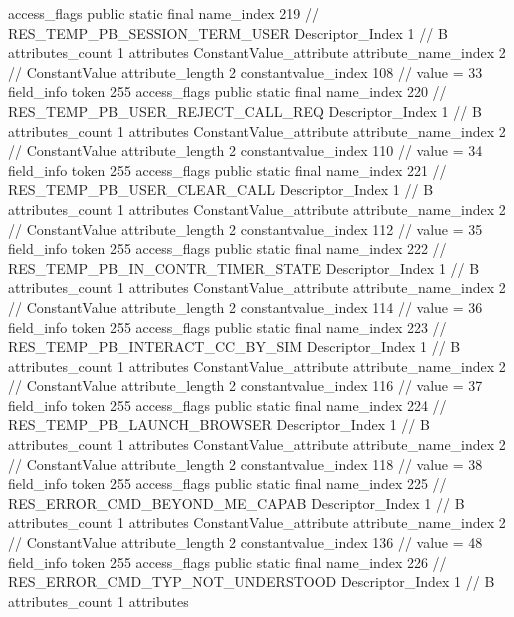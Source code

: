 {{{{{				access_flags	public static final
				name_index	219		// RES_TEMP_PB_SESSION_TERM_USER
				Descriptor_Index	1		// B
				attributes_count	1
				attributes {
				ConstantValue_attribute {
					attribute_name_index	2		// ConstantValue
					attribute_length	2
					constantvalue_index	108		// value = 33
				}
				}
			}
			field_info {
				token	255
				access_flags	public static final
				name_index	220		// RES_TEMP_PB_USER_REJECT_CALL_REQ
				Descriptor_Index	1		// B
				attributes_count	1
				attributes {
				ConstantValue_attribute {
					attribute_name_index	2		// ConstantValue
					attribute_length	2
					constantvalue_index	110		// value = 34
				}
				}
			}
			field_info {
				token	255
				access_flags	public static final
				name_index	221		// RES_TEMP_PB_USER_CLEAR_CALL
				Descriptor_Index	1		// B
				attributes_count	1
				attributes {
				ConstantValue_attribute {
					attribute_name_index	2		// ConstantValue
					attribute_length	2
					constantvalue_index	112		// value = 35
				}
				}
			}
			field_info {
				token	255
				access_flags	public static final
				name_index	222		// RES_TEMP_PB_IN_CONTR_TIMER_STATE
				Descriptor_Index	1		// B
				attributes_count	1
				attributes {
				ConstantValue_attribute {
					attribute_name_index	2		// ConstantValue
					attribute_length	2
					constantvalue_index	114		// value = 36
				}
				}
			}
			field_info {
				token	255
				access_flags	public static final
				name_index	223		// RES_TEMP_PB_INTERACT_CC_BY_SIM
				Descriptor_Index	1		// B
				attributes_count	1
				attributes {
				ConstantValue_attribute {
					attribute_name_index	2		// ConstantValue
					attribute_length	2
					constantvalue_index	116		// value = 37
				}
				}
			}
			field_info {
				token	255
				access_flags	public static final
				name_index	224		// RES_TEMP_PB_LAUNCH_BROWSER
				Descriptor_Index	1		// B
				attributes_count	1
				attributes {
				ConstantValue_attribute {
					attribute_name_index	2		// ConstantValue
					attribute_length	2
					constantvalue_index	118		// value = 38
				}
				}
			}
			field_info {
				token	255
				access_flags	public static final
				name_index	225		// RES_ERROR_CMD_BEYOND_ME_CAPAB
				Descriptor_Index	1		// B
				attributes_count	1
				attributes {
				ConstantValue_attribute {
					attribute_name_index	2		// ConstantValue
					attribute_length	2
					constantvalue_index	136		// value = 48
				}
				}
			}
			field_info {
				token	255
				access_flags	public static final
				name_index	226		// RES_ERROR_CMD_TYP_NOT_UNDERSTOOD
				Descriptor_Index	1		// B
				attributes_count	1
				attributes {
}}}}}}
